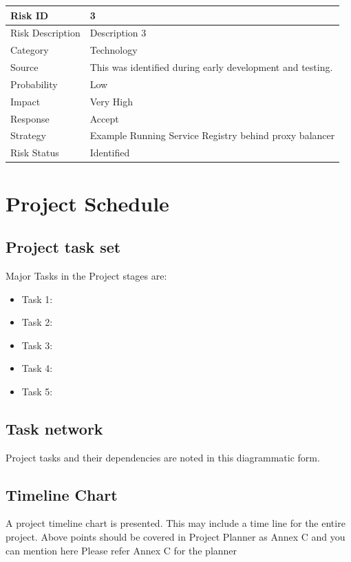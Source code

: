 \documentclass[oneside,a4paper,12pt]{report}
\begin{document}
\begin{table}[!htbp]
\begin{center}
\def\arraystretch{1.5}
\begin{tabularx}{\textwidth}{| l | X |}
\hline
Risk ID	& 3 \\ \hline
Risk Description	& Description 3 \\ \hline
Category	& Technology \\ \hline
Source	& This was identified during early development and testing. \\ \hline
Probability	& Low \\ \hline
Impact	& Very High \\ \hline
Response	& Accept \\ \hline
Strategy	& Example Running Service Registry behind proxy balancer  \\ \hline
Risk Status	& Identified \\ \hline
\end{tabularx}
\end{center}
\label{tab:risk3}
\end{table}

\section{Project Schedule}
\subsection{Project task set}
Major Tasks in the Project stages are:
\begin{itemize}
  \item Task 1:
  \item Task 2:
  \item Task 3:
  \item Task 4:
  \item Task 5:
\end{itemize}

\subsection{Task network}
Project tasks and their dependencies are noted in this diagrammatic form.
\subsection{Timeline Chart}
A project timeline chart is presented. This may include a time line for the entire project.
Above points should be covered  in Project Planner as Annex C and you can mention here Please refer Annex C for the planner
\end{document}
